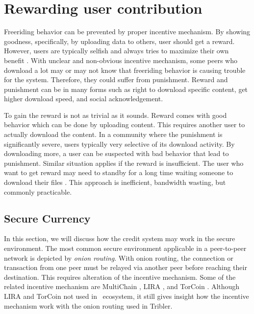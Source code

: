 \section{Rewarding user contribution}
Freeriding behavior can be prevented by proper incentive mechanism. By showing goodness, specifically, by uploading data to others, user should get a reward. However, users are typically selfish and always tries to maximize their own benefit \cite{2015:incentivep2pgame:kang}. With unclear and non-obvious incentive mechanism, some peers who download a lot may or may not know that freeriding behavior is causing trouble for the system. Therefore, they could suffer from punishment. Reward and punishment can be in many forms such as right to download specific content, get higher download speed, and social acknowledgement.

To gain the reward is not as trivial as it sounds. Reward comes with good behavior which can be done by uploading content. This requires another user to actually download the content. In a community where the punishment is significantly severe, users typically very selective of its download activity. By downloading more, a user can be suspected with bad behavior that lead to punishment. Similar situation applies if the reward is insufficient. The user who want to get reward may need to standby for a long time waiting someone to download their files \cite{2013:survivepriv:jia}. This approach is inefficient, bandwidth wasting, but commonly practicable\cite{2013:survivepriv:jia}.


\subsection{Secure Currency}
\label{section:sec_currency}
In this section, we will discuss how the credit system may work in the secure environment. The most common secure environment applicable in a peer-to-peer network is depicted by \textit{onion routing}. With onion routing, the connection or transaction from one peer must be relayed via another peer before reaching their destination. This requires alteration of the incentive mechanism. Some of the related incentive mechanism are MultiChain \cite{2015:multichain:norberhuis}, LIRA \cite{2013:lira:jansen}, and TorCoin \cite{2014:torcoin:ghosh}. Although LIRA and TorCoin not used in \bt~ecosystem, it still gives insight how the incentive mechanism work with the onion routing used in Tribler.

